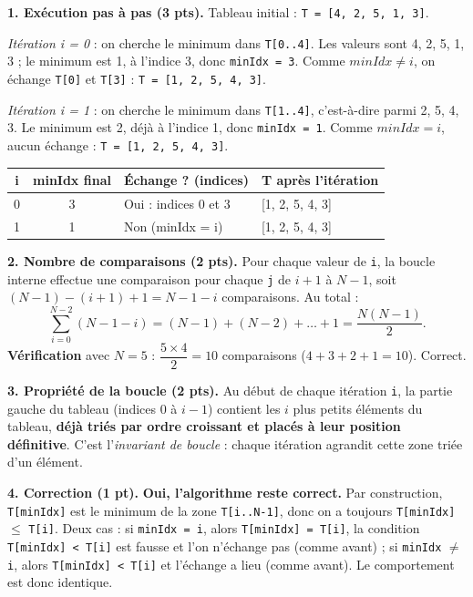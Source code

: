 \documentclass[11pt]{article}
\begin{document}
\begin{corrige}
\textbf{1. Exécution pas à pas (3 pts).} Tableau initial : \texttt{T = [4, 2, 5, 1, 3]}.

\emph{Itération i = 0} : on cherche le minimum dans \texttt{T[0..4]}. Les valeurs sont 4, 2, 5, 1, 3 ; le minimum est 1, à l'indice 3, donc \texttt{minIdx = 3}. Comme $minIdx \neq i$, on échange \texttt{T[0]} et \texttt{T[3]} : \texttt{T = [1, 2, 5, 4, 3]}.

\emph{Itération i = 1} : on cherche le minimum dans \texttt{T[1..4]}, c'est-à-dire parmi 2, 5, 4, 3. Le minimum est 2, déjà à l'indice 1, donc \texttt{minIdx = 1}. Comme $minIdx = i$, aucun échange : \texttt{T = [1, 2, 5, 4, 3]}.

\begin{center}
\begin{tabularx}{\linewidth}{|c|c|X|X|}
\hline
\rowcolor{popblueL}\textbf{i} & \textbf{minIdx final} & \textbf{Échange ? (indices)} & \textbf{T après l'itération} \\
\hline
0 & 3 & Oui : indices 0 et 3 & [1, 2, 5, 4, 3] \\
\hline
1 & 1 & Non (minIdx = i) & [1, 2, 5, 4, 3] \\
\hline
\end{tabularx}
\end{center}

\textbf{2. Nombre de comparaisons (2 pts).} Pour chaque valeur de \texttt{i}, la boucle interne effectue une comparaison pour chaque \texttt{j} de $i+1$ à $N-1$, soit $(N-1) - (i+1) + 1 = N - 1 - i$ comparaisons. Au total :
\[ \sum_{i=0}^{N-2} (N - 1 - i) = (N-1) + (N-2) + \dots + 1 = \frac{N(N-1)}{2}. \]
\textbf{Vérification} avec $N = 5$ : $\dfrac{5 \times 4}{2} = 10$ comparaisons ($4 + 3 + 2 + 1 = 10$). Correct.

\textbf{3. Propriété de la boucle (2 pts).} Au début de chaque itération \texttt{i}, la partie gauche du tableau (indices $0$ à $i-1$) contient les $i$ plus petits éléments du tableau, \textbf{déjà triés par ordre croissant et placés à leur position définitive}. C'est l'\emph{invariant de boucle} : chaque itération agrandit cette zone triée d'un élément.

\textbf{4. Correction (1 pt).} \textbf{Oui, l'algorithme reste correct.} Par construction, \texttt{T[minIdx]} est le minimum de la zone \texttt{T[i..N-1]}, donc on a toujours \texttt{T[minIdx]} $\leq$ \texttt{T[i]}. Deux cas : si \texttt{minIdx = i}, alors \texttt{T[minIdx] = T[i]}, la condition \texttt{T[minIdx] < T[i]} est fausse et l'on n'échange pas (comme avant) ; si \texttt{minIdx} $\neq$ \texttt{i}, alors \texttt{T[minIdx] < T[i]} et l'échange a lieu (comme avant). Le comportement est donc identique.


\end{corrige}
\end{document}
